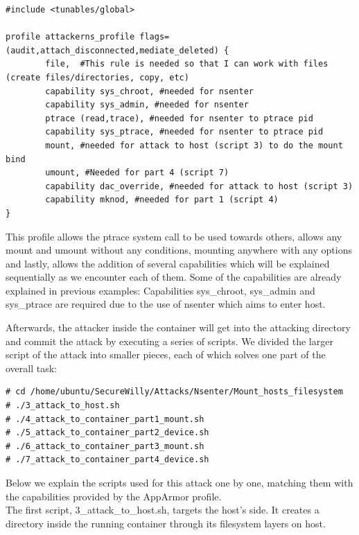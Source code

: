 \begin{lstlisting}[style=Dockerfile, caption={AppArmor profile attackerns\_profile}]
#include <tunables/global>

profile attackerns_profile flags=(audit,attach_disconnected,mediate_deleted) {
        file,  #This rule is needed so that I can work with files (create files/directories, copy, etc)
        capability sys_chroot, #needed for nsenter
        capability sys_admin, #needed for nsenter
        ptrace (read,trace), #needed for nsenter to ptrace pid
        capability sys_ptrace, #needed for nsenter to ptrace pid
        mount, #needed for attack to host (script 3) to do the mount bind
        umount, #Needed for part 4 (script 7)
        capability dac_override, #needed for attack to host (script 3)
        capability mknod, #needed for part 1 (script 4)
}
\end{lstlisting}

This profile allows the ptrace system call to be used towards others, allows any mount and umount without any conditions, mounting anywhere with any options and lastly, allows the addition of several capabilities which will be explained sequentially as we encounter each of them. Some of the capabilities are already explained in previous examples: Capabilities sys\_chroot, sys\_admin and sys\_ptrace
are required due to the use of nsenter which aims to enter host.

Afterwards, the attacker inside the container will get into the attacking directory and commit the attack by executing a series of scripts. We divided the larger script of the attack into smaller pieces, each of which solves one part of the overall task:

\begin{lstlisting}[style=dockercommands]
# cd /home/ubuntu/SecureWilly/Attacks/Nsenter/Mount_hosts_filesystem
# ./3_attack_to_host.sh
# ./4_attack_to_container_part1_mount.sh
# ./5_attack_to_container_part2_device.sh
# ./6_attack_to_container_part3_mount.sh
# ./7_attack_to_container_part4_device.sh
\end{lstlisting}

Below we explain the scripts used for this attack one by one, matching them with the capabilities provided by the AppArmor profile.
\\

The first script, 3\_attack\_to\_host.sh, targets the host's side. It creates a directory inside the running container through its filesystem layers on host.

